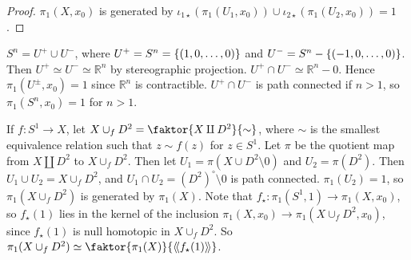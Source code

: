 \begin{proof}
	\( \pi_1(X,x_0) \) is generated by \( \iota_{1\star}(\pi_1(U_1,x_0)) \cup \iota_{2\star}(\pi_1(U_2,x_0)) = \qty{1} \).
\end{proof}
\begin{example}
	\( S^n = U^+ \cup U^- \), where \( U^+ = S^n = \qty{\qty(1, 0, \dots, 0)} \) and \( U^- = S^n - \qty{\qty(-1,0,\dots,0)} \).
	Then \( U^+ \simeq U^- \simeq \mathbb R^n \) by stereographic projection.
	\( U^+ \cap U^- \simeq \mathbb R^n - \qty{0} \).
	Hence \( \pi_1(U^\pm, x_0) = 1 \) since \( \mathbb R^n \) is contractible.
	\( U^+ \cap U^- \) is path connected if \( n > 1 \), so \( \pi_1(S^n, x_0) = 1 \) for \( n > 1 \).
\end{example}
\begin{example}
	If \( f \colon S^1 \to X \), let \( X \cup_f D^2 = \faktor{X \amalg D^2}{\sim} \), where \( \sim \) is the smallest equivalence relation such that \( z \sim f(z) \) for \( z \in S^1 \).
	Let \( \pi \) be the quotient map from \( X \amalg D^2 \) to \( X \cup_f D^2 \).
	Then let \( U_1 = \pi(X \cup D^2 \setminus \qty{0}) \) and \( U_2 = \pi(D^2) \).
	Then \( U_1 \cup U_2 = X \cup_f D^2 \), and \( U_1 \cap U_2 = (D^2)^\circ \setminus \qty{0} \) is path connected.
	\( \pi_1(U_2) = 1 \), so \( \pi_1(X \cup_f D^2) \) is generated by \( \pi_1(X) \).
	Note that \( f_\star \colon \pi_1(S^1, 1) \to \pi_1(X,x_0) \), so \( f_\star(1) \) lies in the kernel of the inclusion \( \pi_1(X,x_0) \to \pi_1(X \cup_f D^2, x_0) \), since \( f_\star(1) \) is null homotopic in \( X \cup_f D^2 \).
	So \( \pi_1(X \cup_f D^2) \simeq \faktor{\pi_1(X)}{\ngenset{f_\star(1)}} \).
\end{example}

